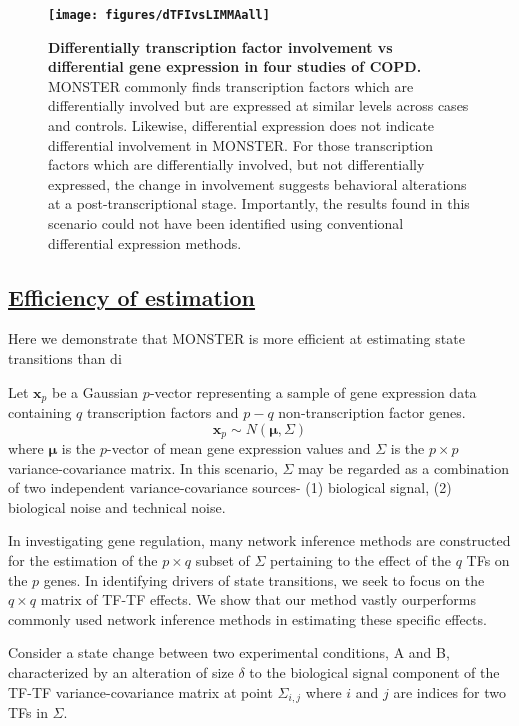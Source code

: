 \documentclass[english]{article}
\begin{document}
\begin{figure}
\textbf{\texttt{[image: figures/dTFIvsLIMMAall]}
}\caption{\textbf{Differentially transcription factor involvement vs differential
gene expression in four studies of COPD.} MONSTER commonly finds transcription
factors which are differentially involved but are expressed at similar
levels across cases and controls. Likewise, differential expression
does not indicate differential involvement in MONSTER. For those transcription
factors which are differentially involved, but not differentially
expressed, the change in involvement suggests behavioral alterations
at a post-transcriptional stage. Importantly, the results found in
this scenario could not have been identified using conventional differential
expression methods.}


\label{fig:sup_expression}
\end{figure}



\subsection*{\uline{Efficiency of estimation}}

Here we demonstrate that MONSTER is more efficient at estimating state
transitions than di

Let $\mathbf{x}_{p}$ be a Gaussian $p$-vector representing a sample
of gene expression data containing $q$ transcription factors and
$p-q$ non-transcription factor genes. 
\[
\mathbf{x}_{p}\sim N\left(\mathbf{\mu},\Sigma\right)
\]
where $\mathbf{\mu}$ is the $p$-vector of mean gene expression values
and $\Sigma$ is the $p\times p$ variance-covariance matrix. In this
scenario, $\Sigma$ may be regarded as a combination of two independent
variance-covariance sources- (1) biological signal, (2) biological
noise and technical noise.

In investigating gene regulation, many network inference methods are
constructed for the estimation of the $p\times q$ subset of $\Sigma$
pertaining to the effect of the $q$ TFs on the $p$ genes. In identifying
drivers of state transitions, we seek to focus on the $q\times q$
matrix of TF-TF effects. We show that our method vastly ourperforms
commonly used network inference methods in estimating these specific
effects.

Consider a state change between two experimental conditions, A and
B, characterized by an alteration of size $\delta$ to the biological
signal component of the TF-TF variance-covariance matrix at point
$\Sigma_{i,j}$ where $i$ and $j$ are indices for two TFs in $\Sigma$.
\end{document}
